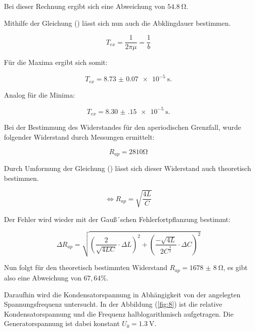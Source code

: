 Bei dieser Rechnung ergibt sich eine Abweichung von $\SI{54.8}{\ohm}$.


Mithilfe der Gleichung () lässt sich nun auch die Abklingdauer bestimmen.

\begin{equation*}
  T_{ex} = \frac{1}{2\pi\mu} = \frac{1}{b}
\end{equation*}

Für die Maxima ergibt sich somit:

\begin{equation*}
  T_{ex} = \SI{8.73(7)e-5}{\second}.
\end{equation*}

Analog für die Minima:

\begin{equation*}
  T_{ex} = \SI{8.30(15)e-5}{\second}.
\end{equation*}


Bei der Bestimmung des Widerstandes für den aperiodischen Grenzfall, wurde folgender
Widerstand durch Messungen ermittelt:

\begin{equation*}
  R_{ap} = 2810 \si{\ohm}
\end{equation*}

Durch Umformung der Gleichung () lässt sich dieser Widerstand auch theoretisch bestimmen.

\begin{equation*}
  \iff R_{ap} = \sqrt{\frac{4L}{C}}
\end{equation*}

Der Fehler wird wieder mit der Gauß´schen Fehlerfortpflanzung bestimmt:

\begin{equation*}
  \Delta R_{ap} = \sqrt{\left( \frac{2}{\sqrt{4LC}}\cdot \Delta L\right)^2 +
  \left( \frac{-\sqrt{4L}}{2C^{\frac{3}{2}}}\cdot \Delta C \right)^2}
\end{equation*}

Nun folgt für den theoretisch bestimmten Widerstand $R_{ap} = \SI{1678(8)}{\ohm}$,
es gibt also eine Abweichung von $67,64 \% $.


Daraufhin wird die Kondensatorspannung in Abhängigkeit von der angelegten Spannungsfrequenz
untersucht. In der Abbildung (\ref{fig:8}) ist die relative Kondensatorspannung und die
Frequenz halblogarithmisch aufgetragen. Die Generatorspannung ist dabei konstant
$ U_0 = \SI{1.3}{\V}$.


